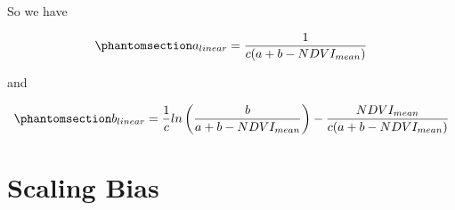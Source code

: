 \documentclass[
  letterpaper,
  DIV=11,
  numbers=noendperiod]{scrartcl}
\begin{document}
So we have

\begin{equation}\phantomsection\label{eq-alinear}{
a_{linear} = \frac{1}{c(a+b-NDVI_{mean})}
}\end{equation}

and

\begin{equation}\phantomsection\label{eq-blinear}{
b_{linear} = \frac{1}{c}ln\left(\frac{b}{a+b-NDVI_{mean}}\right)-\frac{NDVI_{mean}}{c(a+b-NDVI_{mean})}
}\end{equation}

\section{Scaling Bias}\label{scaling-bias}
\end{document}
